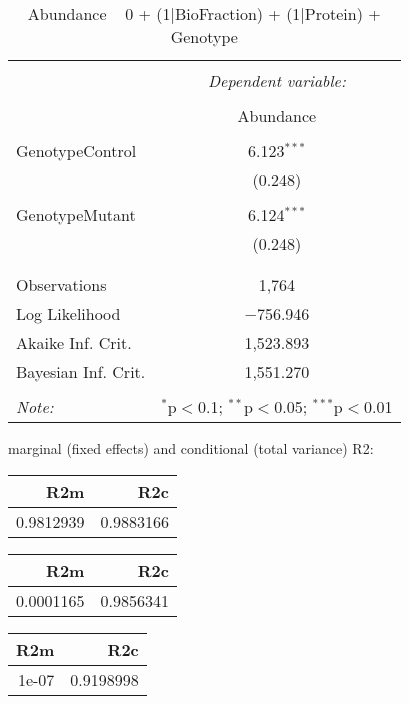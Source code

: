 \documentclass[11pt]{report}
\begin{document}
\begin{table}[!htbp] \centering 
  \caption{Abundance ~ 0 + (1|BioFraction) + (1|Protein) + Genotype} 
  \label{} 
\begin{tabular}{@{\extracolsep{5pt}}lc} 
\\[-1.8ex]\hline 
\hline \\[-1.8ex] 
 & \multicolumn{1}{c}{\textit{Dependent variable:}} \\ 
\cline{2-2} 
\\[-1.8ex] & Abundance \\ 
\hline \\[-1.8ex] 
 GenotypeControl & 6.123$^{***}$ \\ 
  & (0.248) \\ 
  & \\ 
 GenotypeMutant & 6.124$^{***}$ \\ 
  & (0.248) \\ 
  & \\ 
\hline \\[-1.8ex] 
Observations & 1,764 \\ 
Log Likelihood & $-$756.946 \\ 
Akaike Inf. Crit. & 1,523.893 \\ 
Bayesian Inf. Crit. & 1,551.270 \\ 
\hline 
\hline \\[-1.8ex] 
\textit{Note:}  & \multicolumn{1}{r}{$^{*}$p$<$0.1; $^{**}$p$<$0.05; $^{***}$p$<$0.01} \\ 
\end{tabular} 
\end{table} 
marginal (fixed effects) and conditional (total variance) R2:

\begin{tabular}{r|r}
\hline
R2m & R2c\\
\hline
0.9812939 & 0.9883166\\
\hline
\end{tabular}

\begin{tabular}{r|r}
\hline
R2m & R2c\\
\hline
0.0001165 & 0.9856341\\
\hline
\end{tabular}

\begin{tabular}{r|r}
\hline
R2m & R2c\\
\hline
1e-07 & 0.9198998\\
\hline
\end{tabular}
\end{document}

